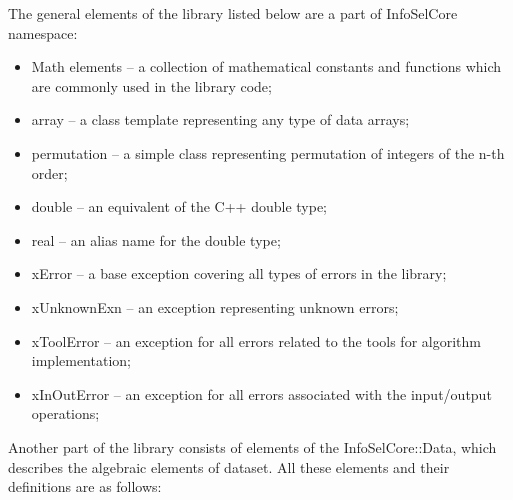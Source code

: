 \documentclass[a4paper,fleqn]{report}
\begin{document}
The general elements of the library listed below are a part of InfoSelCore namespace: 

\begin{itemize}
\item Math elements -- a collection of mathematical constants and functions which are commonly used in the library code;
\item array -- a class template representing any type of data arrays;
\item permutation -- a simple class representing permutation of integers of the n-th order;
\item double -- an equivalent of the C++ double type;
\item real -- an alias name for the double type;
\end{itemize}	

\begin{itemize}
\item xError -- a base exception covering all types of errors in the library;
\item xUnknownExn -- an exception representing unknown errors;
\item xToolError -- an exception for all errors related to the tools for algorithm implementation;
\item xInOutError -- an exception for all errors associated with the input/output operations;
\end{itemize}

Another part of the library consists of elements of the InfoSelCore::Data, which describes the algebraic elements of dataset.
All these elements and their definitions are as follows:
\end{document}
